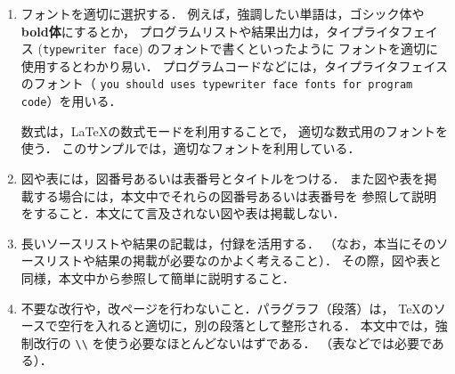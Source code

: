\documentclass{ujarticle}[11pt]
\begin{document}
\begin{enumerate}
    \item フォントを適切に選択する．
    例えば，強調したい単語は，{\gt ゴシック体}や{\gt \bf bold体}にするとか，
    プログラムリストや結果出力は，タイプライタフェイス
    (\verb|typewriter face|) のフォントで書くといったように
    フォントを適切に使用するとわかり易い．
    プログラムコードなどには，タイプライタフェイスのフォント（
    \verb|you should uses typewriter face fonts for program code|）を用いる．
     
    数式は，\LaTeX の数式モードを利用することで，
    適切な数式用のフォントを使う．
    このサンプルでは，適切なフォントを利用している．
     
    \item 図や表には，図番号あるいは表番号とタイトルをつける．
    また図や表を掲載する場合には，本文中でそれらの図番号あるいは表番号を
    参照して説明をすること．本文にて言及されない図や表は掲載しない．
     
    \item 長いソースリストや結果の記載は，付録を活用する．
    （なお，本当にそのソースリストや結果の掲載が必要なのかよく考えること）．
    その際，図や表と同様，本文中から参照して簡単に説明すること．
     
    \item 不要な改行や，改ページを行わないこと．パラグラフ（段落）は，
    TeXのソースで空行を入れると適切に，別の段落として整形される．
    本文中では，強制改行の \verb|\\| を使う必要なほとんどないはずである．
    （表などでは必要である）．
     
    \end{enumerate}
     
\end{document}
